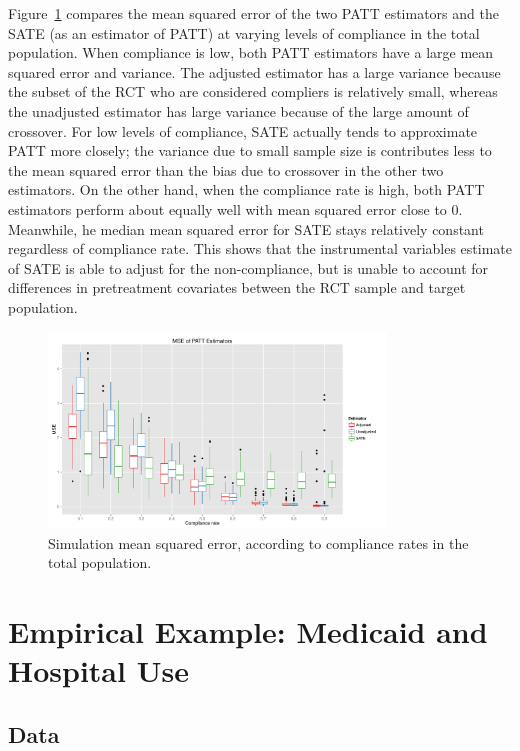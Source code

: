 \documentclass[12pt]{article}
\begin{document}
Figure~\ref{fig:sim_compliance} compares the mean squared error of the two PATT estimators and the SATE (as an estimator of PATT) at varying levels of compliance in the total population.  When compliance is low, both PATT estimators have a large mean squared error and variance.  The adjusted estimator has a large variance because the subset of the RCT who are considered compliers is relatively small, whereas the unadjusted estimator has large variance because of the large amount of crossover.  For low levels of compliance, SATE actually tends to approximate PATT more closely; the variance due to small sample size is contributes less to the mean squared error than the bias due to crossover in the other two estimators.  On the other hand, when the compliance rate is high, both PATT estimators perform about equally well with mean squared error close to $0$.  Meanwhile, he median mean squared error for SATE stays relatively constant regardless of compliance rate.  This shows that the instrumental variables estimate of SATE is able to adjust for the non-compliance, but is unable to account for differences in pretreatment covariates between the RCT sample and target population.

\begin{figure}[htbp]
\begin{center}
\includegraphics[width = 0.8\textwidth]{mse_boxplots_B5}
\caption{Simulation mean squared error, according to compliance rates in the total population.}
\label{fig:sim_compliance}
\end{center}
\end{figure}





\section{Empirical Example: Medicaid and Hospital Use}
\subsection{Data}
\end{document}
